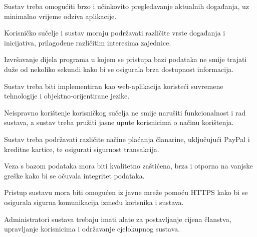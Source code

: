 			 \begin{packed_item}
			\item Sustav treba omogućiti brzo i učinkovito pregledavanje aktualnih događanja, uz minimalno vrijeme odziva aplikacije.
			\item Korisničko sučelje i sustav moraju podržavati različite vrste događanja i inicijativa, prilagođene različitim interesima zajednice.
			\item Izvršavanje dijela programa u kojem se pristupa bazi podataka ne smije trajati duže od nekoliko sekundi kako bi se osigurala brza dostupnost informacija.
			\item Sustav treba biti implementiran kao web-aplikacija koristeći suvremene tehnologije i objektno-orijentirane jezike.
			\item Neispravno korištenje korisničkog sučelja ne smije narušiti funkcionalnost i rad sustava, a sustav treba pružiti jasne upute korisnicima o načinu korištenja.
			\item Sustav treba podržavati različite načine plaćanja članarine, uključujući PayPal i kreditne kartice, te osigurati sigurnost transakcija.
			\item Veza s bazom podataka mora biti kvalitetno zaštićena, brza i otporna na vanjske greške kako bi se očuvala integritet podataka.
			\item Pristup sustavu mora biti omogućen iz javne mreže pomoću HTTPS kako bi se osigurala sigurna komunikacija između korisnika i sustava.
			\item Administratori sustava trebaju imati alate za postavljanje cijena članstva, upravljanje korisnicima i održavanje cjelokupnog sustava.
			 \end{packed_item}
			 
			 
	